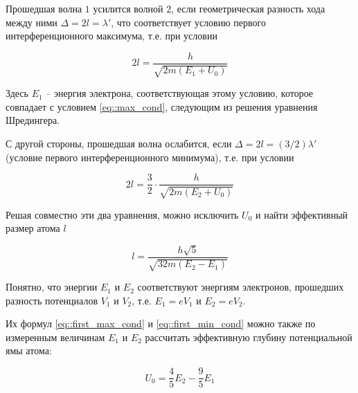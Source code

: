 Прошедшая волна $1$ усилится волной $2$, если геометрическая разность хода между
ними $\Delta = 2l = \lambda'$, что соответствует условию первого
интерференционного максимума, т.е. при условии

\begin{equation} \label{eq::first_max_cond}
  2l = \frac{h}{\sqrt{2m(E_1 + U_0)}}
\end{equation}

Здесь $E_1$ -- энергия электрона, соответствующая этому условию, которое
совпадает с условием \eqref{eq::max_cond}, следующим из решения уравнения
Шредингера.

С другой стороны, прошедшая волна ослабится, если $\Delta = 2l = (3/2)\lambda'$
(условие первого интерференционного минимума), т.е. при условии

\begin{equation} \label{eq::first_min_cond}
  2l = \frac{3}{2} \cdot \frac{h}{\sqrt{2m(E_2 + U_0)}}
\end{equation}

Решая совместно эти два уравнения, можно исключить $U_0$ и найти эффективный
размер атома $l$

\begin{equation}
  l = \frac{h \sqrt{5}}{\sqrt{32m(E_2 - E_1)}}
\end{equation}

Понятно, что энергии $E_1$ и $E_2$ соответствуют энергиям электронов, прошедших
разность потенциалов $V_1$ и $V_2$, т.е. $E_1 = e V_1$ и $E_2 = e V_2$.

Их формул \eqref{eq::first_max_cond} и \eqref{eq::first_min_cond} можно также по
измеренным величинам $E_1$ и $E_2$ рассчитать эффективную глубину потенциальной
ямы атома:

\begin{equation}
  U_0 = \frac{4}{5} E_2 - \frac{9}{5} E_1
\end{equation}
